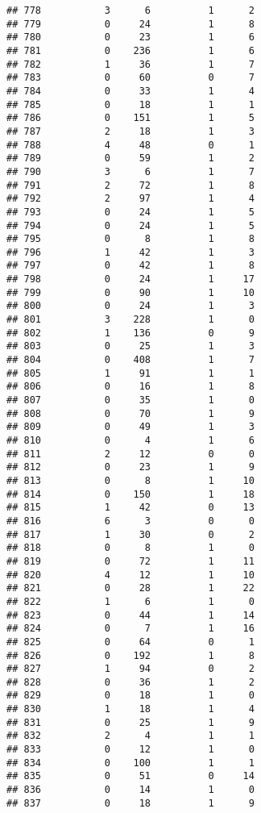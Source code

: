 \documentclass[]{article}
\begin{document}
\begin{verbatim}
## 778           3      6          1      2
## 779           0     24          1      8
## 780           0     23          1      6
## 781           0    236          1      6
## 782           1     36          1      7
## 783           0     60          0      7
## 784           0     33          1      4
## 785           0     18          1      1
## 786           0    151          1      5
## 787           2     18          1      3
## 788           4     48          0      1
## 789           0     59          1      2
## 790           3      6          1      7
## 791           2     72          1      8
## 792           2     97          1      4
## 793           0     24          1      5
## 794           0     24          1      5
## 795           0      8          1      8
## 796           1     42          1      3
## 797           0     42          1      8
## 798           0     24          1     17
## 799           0     90          1     10
## 800           0     24          1      3
## 801           3    228          1      0
## 802           1    136          0      9
## 803           0     25          1      3
## 804           0    408          1      7
## 805           1     91          1      1
## 806           0     16          1      8
## 807           0     35          1      0
## 808           0     70          1      9
## 809           0     49          1      3
## 810           0      4          1      6
## 811           2     12          0      0
## 812           0     23          1      9
## 813           0      8          1     10
## 814           0    150          1     18
## 815           1     42          0     13
## 816           6      3          0      0
## 817           1     30          0      2
## 818           0      8          1      0
## 819           0     72          1     11
## 820           4     12          1     10
## 821           0     28          1     22
## 822           1      6          1      0
## 823           0     44          1     14
## 824           0      7          1     16
## 825           0     64          0      1
## 826           0    192          1      8
## 827           1     94          0      2
## 828           0     36          1      2
## 829           0     18          1      0
## 830           1     18          1      4
## 831           0     25          1      9
## 832           2      4          1      1
## 833           0     12          1      0
## 834           0    100          1      1
## 835           0     51          0     14
## 836           0     14          1      0
## 837           0     18          1      9

\end{verbatim}
\end{document}
